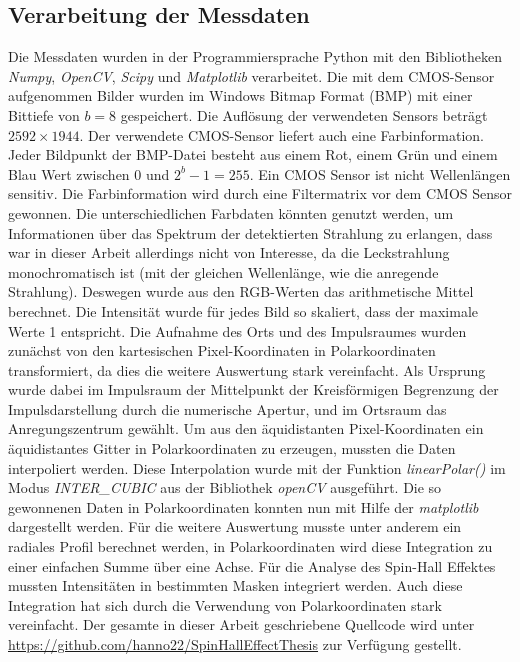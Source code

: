\documentclass[titlepage,  ngerman]{article}
\begin{document}
	\subsection{Verarbeitung der Messdaten}
	\label{sec:polar_calculation}
	Die Messdaten wurden in der Programmiersprache Python mit den Bibliotheken \textit{Numpy}, \textit{OpenCV}, \textit{Scipy} und \textit{Matplotlib} verarbeitet. Die mit dem CMOS-Sensor aufgenommen Bilder wurden im Windows Bitmap Format (BMP) mit einer Bittiefe von  $b = 8$ gespeichert. Die Auflösung der verwendeten Sensors beträgt $2592 \times 1944$. Der verwendete CMOS-Sensor liefert auch eine Farbinformation. Jeder Bildpunkt der BMP-Datei besteht aus einem Rot, einem Grün und einem Blau Wert zwischen $0$ und $2^b - 1= 255$. Ein CMOS Sensor ist nicht Wellenlängen sensitiv. Die Farbinformation wird durch eine Filtermatrix vor dem CMOS Sensor gewonnen. Die unterschiedlichen Farbdaten könnten genutzt werden, um Informationen über das Spektrum der detektierten Strahlung zu erlangen, dass war in dieser Arbeit allerdings nicht von Interesse, da die Leckstrahlung monochromatisch ist (mit der gleichen Wellenlänge, wie die anregende Strahlung). Deswegen wurde aus den RGB-Werten das arithmetische Mittel berechnet. Die Intensität wurde für jedes Bild so skaliert, dass der maximale Werte 1 entspricht. Die Aufnahme des Orts und des Impulsraumes wurden zunächst von den kartesischen Pixel-Koordinaten in Polarkoordinaten transformiert, da dies die weitere Auswertung stark vereinfacht. Als Ursprung wurde dabei im Impulsraum der Mittelpunkt der Kreisförmigen Begrenzung der Impulsdarstellung durch die numerische Apertur, und im Ortsraum das Anregungszentrum gewählt. Um aus den äquidistanten Pixel-Koordinaten ein äquidistantes Gitter in Polarkoordinaten zu erzeugen, mussten die Daten interpoliert werden. Diese Interpolation wurde mit der Funktion \textit{linearPolar()} im Modus \textit{INTER\_CUBIC} aus der Bibliothek \textit{openCV} ausgeführt. Die so gewonnenen Daten in Polarkoordinaten konnten nun mit Hilfe der \textit{matplotlib} dargestellt werden. Für die weitere Auswertung musste unter anderem ein radiales Profil berechnet werden, in Polarkoordinaten wird diese Integration zu einer einfachen Summe über eine Achse. Für die Analyse des Spin-Hall Effektes mussten Intensitäten in bestimmten Masken integriert werden. Auch diese Integration hat sich durch die Verwendung von Polarkoordinaten stark vereinfacht. Der gesamte in dieser Arbeit geschriebene Quellcode wird unter \url{https://github.com/hanno22/SpinHallEffectThesis} zur Verfügung gestellt.
	\newpage
	
\end{document}
